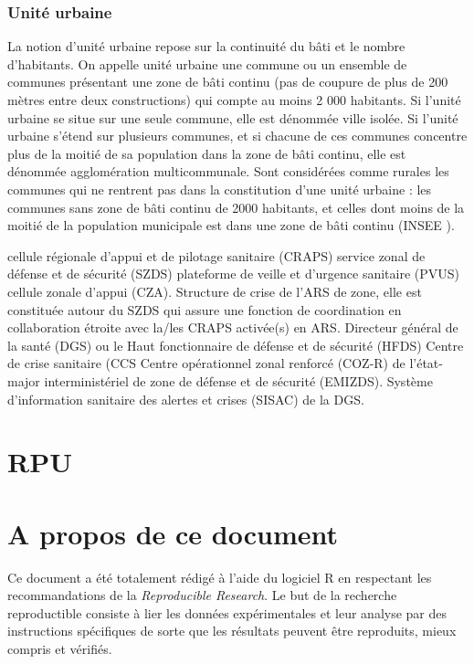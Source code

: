 \documentclass[12pt,english,french,twoside]{report}\usepackage[]{graphicx}\usepackage[]{color}
\begin{document}
\subsection*{Unité urbaine}
La notion d'unité urbaine repose sur la continuité du bâti et le nombre d'habitants. On appelle unité urbaine une commune ou un ensemble de communes présentant une zone de bâti continu (pas de coupure de plus de 200 mètres entre deux constructions) qui compte au moins 2 000 habitants.
Si l'unité urbaine se situe sur une seule commune, elle est dénommée ville isolée. Si l'unité urbaine s'étend sur plusieurs communes, et si chacune de ces communes concentre plus de la moitié de sa population dans la zone de bâti continu, elle est dénommée agglomération multicommunale.
Sont considérées comme rurales les communes qui ne rentrent pas dans la constitution d'une unité urbaine : les communes sans zone de bâti continu de 2000 habitants, et celles dont moins de la moitié de la population municipale est dans une zone de bâti continu (INSEE \cite{4}).

cellule régionale d’appui et de pilotage sanitaire (CRAPS)
service zonal de défense et de sécurité (SZDS)
plateforme de veille et d’urgence sanitaire (PVUS)
cellule zonale d’appui (CZA). Structure de crise de l’ARS de zone, elle est constituée autour du SZDS qui assure une fonction de coordination en collaboration étroite avec la/les CRAPS activée(s) en ARS.
Directeur général de la santé (DGS) ou le Haut fonctionnaire de défense et de sécurité (HFDS)
Centre de crise sanitaire (CCS
Centre opérationnel zonal renforcé (COZ-R) de l’état-major interministériel de zone de défense et de sécurité (EMIZDS).
Système d’information sanitaire des alertes et crises (SISAC) de la DGS.





\newpage
\chapter{RPU}

\newpage
\chapter{A propos de ce document}


Ce document a été totalement rédigé à l'aide du logiciel R \cite{5} en respectant les recommandations de la \emph{Reproducible Research}. Le but de la recherche reproductible consiste à lier les données expérimentales et leur analyse par des instructions spécifiques de sorte que les résultats peuvent être reproduits, mieux compris et vérifiés.
\end{document}
